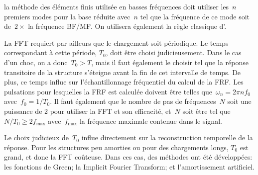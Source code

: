 la méthode des éléments finis utilisée en basses fréquences doit utiliser les~$n$ premiers modes pour la base réduite avec~$n$ tel que la fréquence de ce mode soit de~$2\times$ la fréquence BF/MF. On utilisera également la règle classique d'.

La FFT requiert par ailleurs que le chargement soit périodique. Le temps correspondant à cette période, $T_0$, doit être choisi judicieusement. Dans le cas d'un choc, on a donc~$T_0 > T$, mais il faut également le choisir tel que la réponse transitoire de la structure s'éteigne avant la fin de cet intervalle de temps. De plus, ce temps influe sur l'échantillonnage fréquentiel du calcul de la FRF. Les pulsations pour lesquelles la FRF est calculée doivent être telles que~$\omega_n=2\pi n f_0$ avec~$f_0=1/T_0$. Il faut également que le nombre de pas de fréquences~$N$ soit une puissance de 2 pour utiliser la FFT et son efficacité, et~$N$ soit être tel que~$N/T_0 \ge 2 f_{\max}$ avec~$f_{\max}$ la fréquence maximale contenue dans le signal.

\medskip
Le choix judicieux de~$T_0$ influe directement sur la reconstruction temporelle de la réponse. Pour les structures peu amorties ou pour des chargements longs, $T_0$ est grand, et donc la FFT coûteuse. Dans ces cas, des méthodes ont été développées: les fonctions de Green; la Implicit Fourier Transform; et l'amortissement artificiel.


